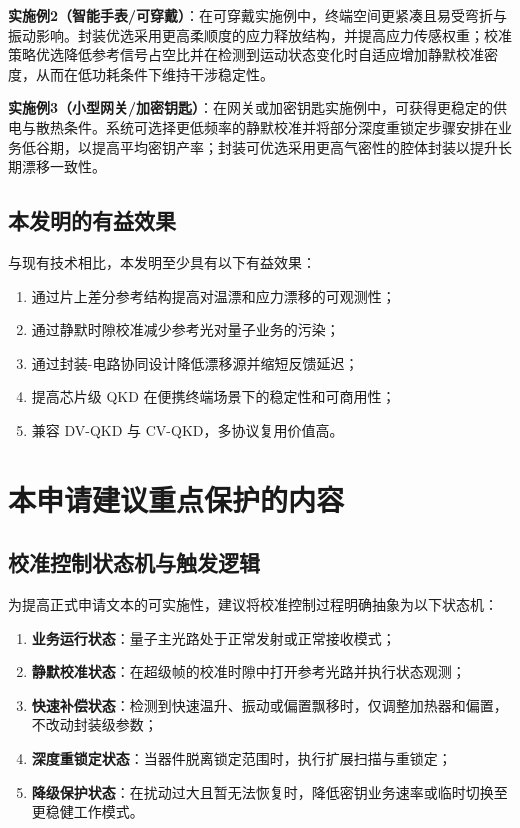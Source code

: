 \documentclass[12pt,a4paper]{article}
\begin{document}
\textbf{实施例2（智能手表/可穿戴）}：在可穿戴实施例中，终端空间更紧凑且易受弯折与振动影响。封装优选采用更高柔顺度的应力释放结构，并提高应力传感权重；校准策略优选降低参考信号占空比并在检测到运动状态变化时自适应增加静默校准密度，从而在低功耗条件下维持干涉稳定性。

\textbf{实施例3（小型网关/加密钥匙）}：在网关或加密钥匙实施例中，可获得更稳定的供电与散热条件。系统可选择更低频率的静默校准并将部分深度重锁定步骤安排在业务低谷期，以提高平均密钥产率；封装可优选采用更高气密性的腔体封装以提升长期漂移一致性。

\subsection{本发明的有益效果}

与现有技术相比，本发明至少具有以下有益效果：
\begin{enumerate}[label=(\arabic*)]
    \item 通过片上差分参考结构提高对温漂和应力漂移的可观测性；
    \item 通过静默时隙校准减少参考光对量子业务的污染；
    \item 通过封装-电路协同设计降低漂移源并缩短反馈延迟；
    \item 提高芯片级 QKD 在便携终端场景下的稳定性和可商用性；
    \item 兼容 DV-QKD 与 CV-QKD，多协议复用价值高。
\end{enumerate}

\section{本申请建议重点保护的内容}

\subsection{校准控制状态机与触发逻辑}

为提高正式申请文本的可实施性，建议将校准控制过程明确抽象为以下状态机：
\begin{enumerate}[label=(\arabic*)]
    \item \textbf{业务运行状态}：量子主光路处于正常发射或正常接收模式；
    \item \textbf{静默校准状态}：在超级帧的校准时隙中打开参考光路并执行状态观测；
    \item \textbf{快速补偿状态}：检测到快速温升、振动或偏置飘移时，仅调整加热器和偏置，不改动封装级参数；
    \item \textbf{深度重锁定状态}：当器件脱离锁定范围时，执行扩展扫描与重锁定；
    \item \textbf{降级保护状态}：在扰动过大且暂无法恢复时，降低密钥业务速率或临时切换至更稳健工作模式。
\end{enumerate}
\end{document}
